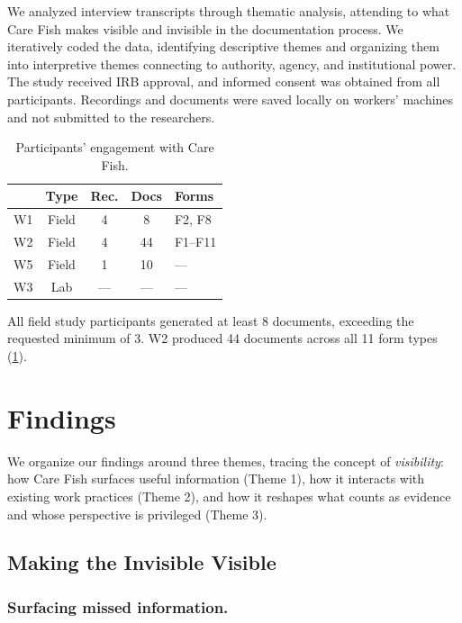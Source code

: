 \documentclass{article}
\begin{document}
We analyzed interview transcripts through thematic analysis, attending to what Care Fish makes visible and invisible in the documentation process. We iteratively coded the data, identifying descriptive themes and organizing them into interpretive themes connecting to authority, agency, and institutional power. The study received IRB approval, and informed consent was obtained from all participants. Recordings and documents were saved locally on workers' machines and not submitted to the researchers.

\begin{table}[t]
\caption{Participants' engagement with Care Fish.}
\label{tab:engagement}
\begin{center}
\begin{small}
\begin{tabular}{lcccl}
\toprule
 & Type & Rec. & Docs & Forms \\
\midrule
W1 & Field & 4 & 8 & F2, F8 \\
W2 & Field & 4 & 44 & F1--F11 \\
W5 & Field & 1 & 10 & --- \\
W3 & Lab & --- & --- & --- \\
\bottomrule
\end{tabular}
\end{small}
\end{center}
\end{table}

All field study participants generated at least 8 documents, exceeding the requested minimum of 3. W2 produced 44 documents across all 11 form types (\cref{tab:engagement}).

\section{Findings}

We organize our findings around three themes, tracing the concept of \textit{visibility}: how Care Fish surfaces useful information (Theme 1), how it interacts with existing work practices (Theme 2), and how it reshapes what counts as evidence and whose perspective is privileged (Theme 3).

\subsection{Making the Invisible Visible}

\subsubsection{Surfacing missed information.}
\end{document}
